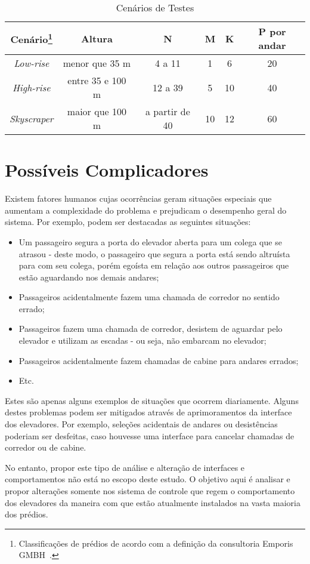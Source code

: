 \begin{savenotes}
\begin{table}[htb!]
\centering
\caption{Cenários de Testes}
\label{tab:cenarios}
\begin{tabular}{|c|c|c|c|c|c|}
\hline
{\bf Cenário\footnote{Classificações de prédios de acordo com a definição da consultoria Emporis GMBH~\cite{Emporis15}.}}    & {\bf Altura} & {\bf N}  & {\bf M}        & {\bf K} & {\bf P por andar} \\ \hline
{\it Low-rise}   & menor que 35 m          & 4 a 11         & 1       & 6       & 20      \\ \hline
{\it High-rise}  & entre 35 e 100 m        & 12 a 39        & 5       & 10      & 40      \\ \hline
{\it Skyscraper} & maior que 100 m         & a partir de 40 & 10      & 12      & 60      \\ \hline
\end{tabular}
\end{table}
\end{savenotes}

\section{Possíveis Complicadores}

Existem fatores humanos cujas ocorrências geram situações especiais que aumentam a complexidade do problema e prejudicam o desempenho geral do sistema. Por exemplo, podem ser destacadas as seguintes situações:

\begin{itemize}
  \item Um passageiro segura a porta do elevador aberta para um colega que se atrasou - deste modo, o passageiro que segura a porta está sendo altruísta para com seu colega, porém egoísta em relação aos outros passageiros que estão aguardando nos demais andares;
  \item Passageiros acidentalmente fazem uma chamada de corredor no sentido errado;
  \item Passageiros fazem uma chamada de corredor, desistem de aguardar pelo elevador e utilizam as escadas - ou seja, não embarcam no elevador;
  \item Passageiros acidentalmente fazem chamadas de cabine para andares errados;
  \item Etc.
\end{itemize}

Estes são apenas alguns exemplos de situações que ocorrem diariamente. Alguns destes problemas podem ser mitigados através de aprimoramentos da interface dos elevadores. Por exemplo, seleções acidentais de andares ou desistências poderiam ser desfeitas, caso houvesse uma interface para cancelar chamadas de corredor ou de cabine.

No entanto, propor este tipo de análise e alteração de interfaces e comportamentos não está no escopo deste estudo. O objetivo aqui é analisar e propor alterações somente nos sistema de controle que regem o comportamento dos elevadores da maneira com que estão atualmente instalados na vasta maioria dos prédios.